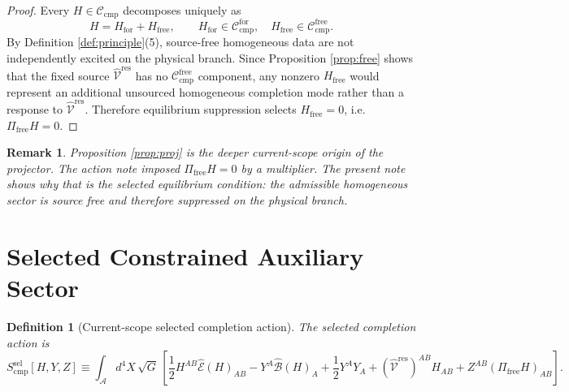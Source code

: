 \documentclass[11pt]{article}
\newcommand{\Sub}{\mathcal A}
\newcommand{\ResidualLift}{\widehat{\mathcal V}^{\mathrm{res}}}
\newcommand{\SubEinLin}{\widehat{\mathcal E}}
\newcommand{\SubGaugeVec}{\widehat{\mathcal B}}
\newcommand{\FreeProj}{\Pi_{\mathrm{free}}}
\newcommand{\GaugeAux}{Y}
\newcommand{\ModeAux}{Z}
\newcommand{\CompClass}{\mathscr C_{\mathrm{cmp}}}
\newcommand{\CompFree}{\mathscr C_{\mathrm{cmp}}^{\mathrm{free}}}
\newcommand{\CompForced}{\mathscr C_{\mathrm{cmp}}^{\mathrm{for}}}
\newcommand{\CompSelectAction}{S_{\mathrm{cmp}}^{\mathrm{sel}}}
\newtheorem{definition}{Definition}
\newtheorem{remark}{Remark}
\begin{document}
\begin{proof}
Every \(H\in\CompClass\) decomposes uniquely as
\[
H=H_{\mathrm{for}}+H_{\mathrm{free}},
\qquad
H_{\mathrm{for}}\in\CompForced,
\quad
H_{\mathrm{free}}\in\CompFree.
\]
By Definition \ref{def:principle}(5), source-free homogeneous data are not independently excited on the physical branch. Since Proposition \ref{prop:free} shows that the fixed source \(\ResidualLift\) has no \(\CompFree\) component, any nonzero \(H_{\mathrm{free}}\) would represent an additional unsourced homogeneous completion mode rather than a response to \(\ResidualLift\). Therefore equilibrium suppression selects \(H_{\mathrm{free}}=0\), i.e. \(\FreeProj H=0\).
\end{proof}

\begin{remark}
Proposition \ref{prop:proj} is the deeper current-scope origin of the projector. The action note imposed \(\FreeProj H=0\) by a multiplier. The present note shows why that is the selected equilibrium condition: the admissible homogeneous sector is source free and therefore suppressed on the physical branch.
\end{remark}

\section{Selected Constrained Auxiliary Sector}

\begin{definition}[Current-scope selected completion action]
\label{def:selected}
The \emph{selected completion action} is
\begin{equation}
\CompSelectAction[H,\GaugeAux,\ModeAux]
\equiv
\int_{\Sub} d^4X\,\sqrt{G}\,
\left[
\frac12 H^{AB}\SubEinLin(H)_{AB}
-\GaugeAux^A\SubGaugeVec(H)_A
+\frac12 \GaugeAux^A\GaugeAux_A
+(\ResidualLift)^{AB}H_{AB}
+\ModeAux^{AB}(\FreeProj H)_{AB}
\right].
\label{eq:selectedaction}
\end{equation}
\end{definition}
\end{document}
